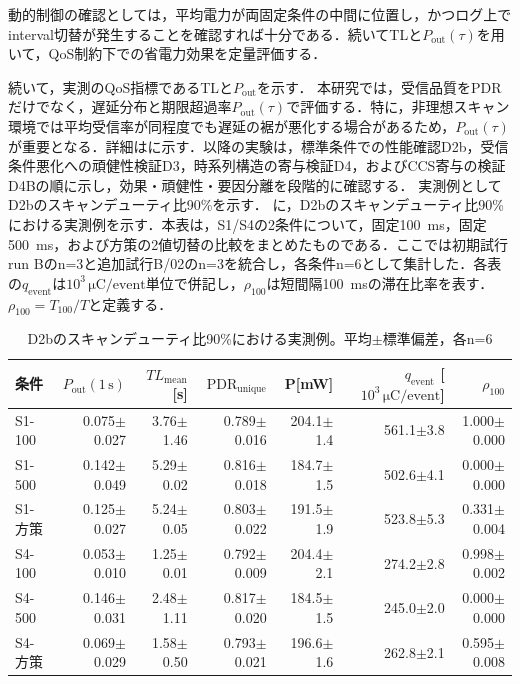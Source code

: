 動的制御の確認としては，平均電力が両固定条件の中間に位置し，かつログ上でinterval切替が発生することを確認すれば十分である．続いてTLと$P_{\mathrm{out}}(\tau)$を用いて，QoS制約下での省電力効果を定量評価する．

続いて，実測のQoS指標であるTLと$P_{\mathrm{out}}$を示す．
本研究では，受信品質をPDRだけでなく，遅延分布と期限超過率$P_{\mathrm{out}}(\tau)$で評価する．特に，非理想スキャン環境では平均受信率が同程度でも遅延の裾が悪化する場合があるため，$P_{\mathrm{out}}(\tau)$が重要となる．詳細はに示す．以降の実験は，標準条件での性能確認D2b，受信条件悪化への頑健性検証D3，時系列構造の寄与検証D4，およびCCS寄与の検証D4Bの順に示し，効果・頑健性・要因分離を段階的に確認する．
実測例としてD2bのスキャンデューティ比90\%を示す．
に，D2bのスキャンデューティ比90\%における実測例を示す．本表は，S1/S4の2条件について，固定\SI{100}{\milli\second}，固定\SI{500}{\milli\second}，および方策の2値切替の比較をまとめたものである．ここでは初期試行run Bのn=3と追加試行B/02のn=3を統合し，各条件n=6として集計した．各表の$q_{\mathrm{event}}$は$10^3\,\si{\micro\coulomb}/\text{event}$単位で併記し，$\rho_{100}$は短間隔\SI{100}{\milli\second}の滞在比率を表す．$\rho_{100}=T_{100}/T$と定義する．

\begin{table}[tb]
  \centering
  \caption{D2bのスキャンデューティ比90\%における実測例。平均$\pm$標準偏差，各n=6}
  \label{tab:d2_summary}
  {\scriptsize
  \setlength{\tabcolsep}{3pt}
  \begin{tabular}{lrrrrrr}
    \toprule
    条件 & $P_{\mathrm{out}}(1\,\mathrm{s})$ & $TL_{\mathrm{mean}}$[s] & $\mathrm{PDR}_{\mathrm{unique}}$ & P[mW] & $q_{\mathrm{event}}$ [$10^3\,\si{\micro\coulomb}/\text{event}$] & $\rho_{100}$ \\
    \midrule
    S1-100   & 0.075$\pm$0.027 & 3.76$\pm$1.46 & 0.789$\pm$0.016 & 204.1$\pm$1.4 & 561.1$\pm$3.8 & 1.000$\pm$0.000 \\
    S1-500   & 0.142$\pm$0.049 & 5.29$\pm$0.02 & 0.816$\pm$0.018 & 184.7$\pm$1.5 & 502.6$\pm$4.1 & 0.000$\pm$0.000 \\
    S1-方策 & 0.125$\pm$0.027 & 5.24$\pm$0.05 & 0.803$\pm$0.022 & 191.5$\pm$1.9 & 523.8$\pm$5.3 & 0.331$\pm$0.004 \\
    \midrule
    S4-100   & 0.053$\pm$0.010 & 1.25$\pm$0.01 & 0.792$\pm$0.009 & 204.4$\pm$2.1 & 274.2$\pm$2.8 & 0.998$\pm$0.002 \\
    S4-500   & 0.146$\pm$0.031 & 2.48$\pm$1.11 & 0.817$\pm$0.020 & 184.5$\pm$1.5 & 245.0$\pm$2.0 & 0.000$\pm$0.000 \\
    S4-方策 & 0.069$\pm$0.029 & 1.58$\pm$0.50 & 0.793$\pm$0.021 & 196.6$\pm$1.6 & 262.8$\pm$2.1 & 0.595$\pm$0.008 \\
    \bottomrule
  \end{tabular}
  }
\end{table}

